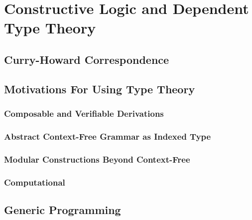 \chapter{Constructive Logic and Dependent Type Theory}
    \section{Curry-Howard Correspondence}
    \section{Motivations For Using Type Theory}
        \subsection{Composable and Verifiable Derivations}
        \subsection{Abstract Context-Free Grammar as Indexed Type}
        \subsection{Modular Constructions Beyond Context-Free}
        \subsection{Computational}
    \section{Generic Programming}